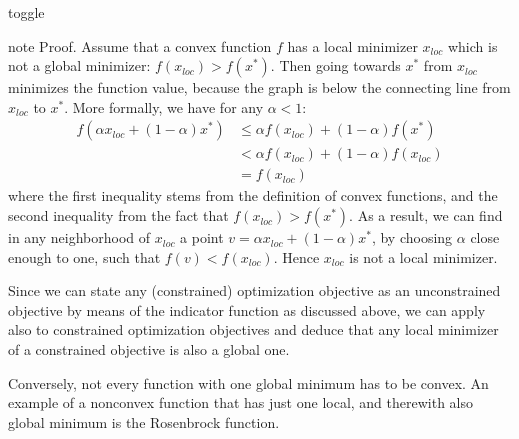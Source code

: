 \documentclass[letterpaper,10pt,english]{jupyterBook}
\begin{document}
\begin{sphinxuseclass}{toggle}
\begin{sphinxadmonition}{note}
\sphinxAtStartPar
Proof. Assume that a convex function \(f\) has a local minimizer \(x_{loc}\) which is not a global minimizer: \(f(x_{loc})>f(x^*)\). Then going towards \(x^*\) from \(x_{loc}\) minimizes the function value, because the graph is below the connecting line from \(x_{loc}\) to \(x^*\). More formally, we have for any \(\alpha<1\):
\begin{align*}
f(\alpha x_{loc} + (1-\alpha)x^*)&\leq \alpha f(x_{loc}) + (1-\alpha)f(x^*)\\
&< \alpha f(x_{loc}) + (1-\alpha)f(x_{loc})\\
& = f(x_{loc})
\end{align*}
\sphinxAtStartPar
where the first inequality stems from the definition of convex functions, and the second inequality from the fact that \(f(x_{loc})>f(x^*)\). As a result, we can find in any neighborhood of \(x_{loc}\) a point \(v = \alpha x_{loc} + (1-\alpha)x^*\), by choosing \(\alpha\) close enough to one, such that \(f(v)<f(x_{loc})\).
Hence \(x_{loc}\) is not a local minimizer.
\end{sphinxadmonition}

\end{sphinxuseclass}
\sphinxAtStartPar
Since we can state any (constrained) optimization objective as an unconstrained objective by means of the indicator function as discussed above, we can apply {\hyperref[\detokenize{optimization_convex:thm_convex}]{}} also to constrained optimization objectives and deduce that any local minimizer of a constrained objective is also a global one.

\sphinxAtStartPar
Conversely, not every function with one global minimum has to be convex. An example of a nonconvex function that has just one local, and therewith also global minimum is the Rosenbrock function.
\end{document}
